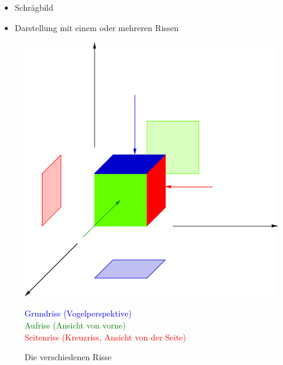 \documentclass[12pt,a4paper]{scrbook}
\begin{document}
\begin{itemize}
  \item Schrägbild
  \item Darstellung mit einem oder mehreren Rissen
\end{itemize}

\begin{figure}[h]
  \centering
  \includegraphics[scale=1]{img/DGeinfuehrung.pdf}
  \caption{Die verschiedenen Risse}
  \textcolor{blue}{Grundriss (Vogelperspektive)}\\
  \textcolor{green}{Aufriss (Ansicht von vorne)}\\
  \textcolor{red}{Seitenriss (Kreuzriss, Ansicht von der Seite)}
\end{figure}
\end{document}
